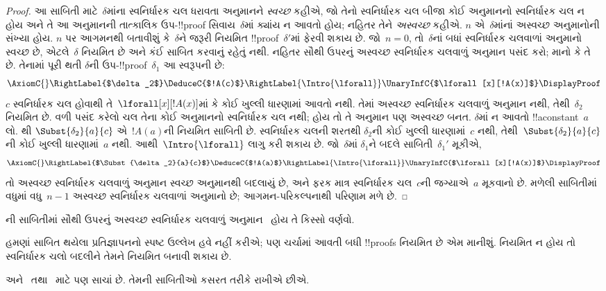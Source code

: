 \documentclass[../../../include/open-logic-section]{subfiles}
\begin{document}
\begin{proof}
આ સાબિતી માટે~$\delta$માંના
સ્વનિર્ધારક ચલ ધરાવતા
અનુમાનને \emph{સ્વચ્છ}
કહીએ, જો તેનો સ્વનિર્ધારક
ચલ બીજા કોઈ અનુમાનનો
સ્વનિર્ધારક ચલ ન હોય
અને તે આ અનુમાનની
તાત્કાલિક ઉપ-!!{proof}
સિવાય~$\delta$માં ક્યાંય
ન આવતો હોય; નહિતર તેને
\emph{અસ્વચ્છ} કહીએ.
$n$ એ~$\delta$માંનાં
અસ્વચ્છ અનુમાનોની સંખ્યા
હોય. $n$ પર આગમનથી
બતાવીશું કે~$\delta$ને
જરૂરી નિયમિત
!!{proof}~$\delta'$માં
ફેરવી શકાય છે.
જો~$n=0$, તો~$\delta$નાં બધાં
સ્વનિર્ધારક ચલવાળાં અનુમાનો
સ્વચ્છ છે, એટલે~$\delta$
નિયમિત છે અને કંઈ સાબિત
કરવાનું રહેતું નથી.
નહિતર સૌથી ઉપરનું
અસ્વચ્છ સ્વનિર્ધારક ચલવાળું
અનુમાન પસંદ કરો;
માનો કે તે~\Intro{\lforall}
છે. તેનામાં પૂરી થતી
$\delta$ની
ઉપ-!!{proof}~$\delta_1$
આ સ્વરૂપની છે:
    \[
    \AxiomC{}
    \RightLabel{$\delta_2$}
    \DeduceC{$!A(c)$}
    \RightLabel{\Intro{\lforall}}
    \UnaryInfC{$\lforall[x][!A(x)]$}
    \DisplayProof
    \]
$c$ સ્વનિર્ધારક ચલ હોવાથી
તે~$\lforall[x][!A(x)]$માં
કે કોઈ ખુલ્લી ધારણામાં
આવતો નથી.
તેમાં અસ્વચ્છ
સ્વનિર્ધારક ચલવાળું અનુમાન
નથી, તેથી~$\delta_2$
નિયમિત છે. વળી પસંદ કરેલો
ચલ તેના કોઈ અનુમાનનો
સ્વનિર્ધારક ચલ નથી;
હોય તો તે અનુમાન પણ
અસ્વચ્છ બનત.
$\delta$માં ન આવતો
!!a{constant}~$a$ લો.
થી
$\Subst{\delta_2}{a}{c}$
એ~$!A(a)$ની નિયમિત
સાબિતી છે.
સ્વનિર્ધારક ચલની શરતથી
$\delta_2$ની કોઈ ખુલ્લી
ધારણામાં~$c$ નથી,
તેથી~$\Subst{\delta_2}{a}{c}$ની
કોઈ ખુલ્લી ધારણામાં~$a$
નથી. આથી~$\Intro{\lforall}$
લાગુ કરી શકાય છે.
જો~$\delta$માં
$\delta_1$ને બદલે
સાબિતી~$\delta_1'$ મૂકીએ,
    \[
    \AxiomC{}
    \RightLabel{$\Subst{\delta_2}{a}{c}$}
    \DeduceC{$!A(a)$}
    \RightLabel{\Intro{\lforall}}
    \UnaryInfC{$\lforall[x][!A(x)]$}
    \DisplayProof
    \]
તો અસ્વચ્છ સ્વનિર્ધારક
ચલવાળું અનુમાન સ્વચ્છ
અનુમાનથી બદલાયું છે,
અને ફરક માત્ર
સ્વનિર્ધારક ચલ~$c$ની
જગ્યાએ~$a$ મૂકવાનો છે.
મળેલી સાબિતીમાં
વધુમાં વધુ~$n-1$
અસ્વચ્છ સ્વનિર્ધારક
ચલવાળાં અનુમાનો છે;
આગમન-પરિકલ્પનાથી
પરિણામ મળે છે.
\end{proof}

\begin{prob}
ની
સાબિતીમાં સૌથી ઉપરનું
અસ્વચ્છ સ્વનિર્ધારક
ચલવાળું અનુમાન~\Elim{\lexists}
હોય તે કિસ્સો વર્ણવો.
\end{prob}

હમણાં સાબિત થયેલા
પ્રતિજ્ઞાપનનો સ્પષ્ટ
ઉલ્લેખ હવે નહીં કરીએ;
પણ ચર્ચામાં આવતી
બધી !!{proof}s નિયમિત
છે એમ માનીશું.
નિયમિત ન હોય તો
સ્વનિર્ધારક ચલો બદલીને
તેમને નિયમિત બનાવી
શકાય છે.

અને~
 તથા~
માટે પણ સાચાં છે.
તેમની સાબિતીઓ કસરત
તરીકે રાખીએ છીએ.
\end{document}
